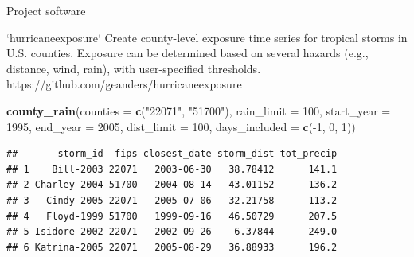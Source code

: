 \documentclass[ignorenonframetext,]{beamer}
\newenvironment{Shaded}{\begin{snugshade}}{\end{snugshade}}
\newcommand{\KeywordTok}[1]{\textcolor[rgb]{0.13,0.29,0.53}{\textbf{{#1}}}}
\newcommand{\DataTypeTok}[1]{\textcolor[rgb]{0.13,0.29,0.53}{{#1}}}
\newcommand{\DecValTok}[1]{\textcolor[rgb]{0.00,0.00,0.81}{{#1}}}
\newcommand{\StringTok}[1]{\textcolor[rgb]{0.31,0.60,0.02}{{#1}}}
\newcommand{\NormalTok}[1]{{#1}}
\begin{document}
\begin{frame}[fragile]{Project software}

\footnotesize

\begin{block}{`hurricaneexposure`}
Create county-level exposure time series for tropical storms in U.S. counties. Exposure can be determined based on several hazards (e.g., distance, wind, rain), with user-specified thresholds. 
https://github.com/geanders/hurricaneexposure
\end{block}

\begin{Shaded}
\begin{Highlighting}[]
\KeywordTok{county_rain}\NormalTok{(}\DataTypeTok{counties =} \KeywordTok{c}\NormalTok{(}\StringTok{"22071"}\NormalTok{, }\StringTok{"51700"}\NormalTok{), }\DataTypeTok{rain_limit =} \DecValTok{100}\NormalTok{, }
            \DataTypeTok{start_year =} \DecValTok{1995}\NormalTok{, }\DataTypeTok{end_year =} \DecValTok{2005}\NormalTok{, }\DataTypeTok{dist_limit =} \DecValTok{100}\NormalTok{,}
            \DataTypeTok{days_included =} \KeywordTok{c}\NormalTok{(-}\DecValTok{1}\NormalTok{, }\DecValTok{0}\NormalTok{, }\DecValTok{1}\NormalTok{))}
\end{Highlighting}
\end{Shaded}

\begin{verbatim}
##       storm_id  fips closest_date storm_dist tot_precip
## 1    Bill-2003 22071   2003-06-30   38.78412      141.1
## 2 Charley-2004 51700   2004-08-14   43.01152      136.2
## 3   Cindy-2005 22071   2005-07-06   32.21758      113.2
## 4   Floyd-1999 51700   1999-09-16   46.50729      207.5
## 5 Isidore-2002 22071   2002-09-26    6.37844      249.0
## 6 Katrina-2005 22071   2005-08-29   36.88933      196.2
\end{verbatim}

\end{frame}
\end{document}
